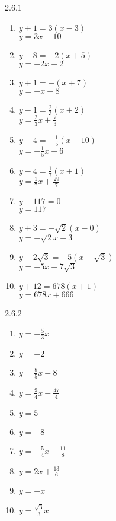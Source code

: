 \begin{Answer}{2.6.1}
	\begin{multicols}{2}
		\begin{enumerate}

			\item $y+1 = 3(x-3)$ \\ $y = 3x-10$
			\item $y-8 = -2(x+5)$ \\ $y = -2x-2$
			\item $y + 1 = -(x+7)$ \\ $y = -x-8$
			\item $y - 1 = \frac{2}{3} (x+2)$ \\ $y = \frac{2}{3} x + \frac{7}{3}$
			\item $y - 4 = -\frac{1}{5} (x-10)$ \\ $y = -\frac{1}{5} x + 6$
			\item $y - 4 = \frac{1}{7}(x + 1)$ \\ $y = \frac{1}{7}x + \frac{29}{7}$
			\item $y - 117 = 0$ \\ $y = 117$
			\item $y + 3 = -\sqrt{2}(x - 0)$ \\ $y = -\sqrt{2}x - 3$
			\item $y - 2\sqrt{3} = -5(x - \sqrt{3})$ \\ $y = -5x + 7\sqrt{3}$
			\item $y + 12 = 678(x + 1)$ \\ $y = 678x + 666$

		\end{enumerate}
	\end{multicols}
\end{Answer}
\begin{Answer}{2.6.2}
	\begin{multicols}{2}
		\begin{enumerate}

			\item $y = -\frac{5}{3}x$
			\item $y = -2$
			\item $y = \frac{8}{5}x - 8$
			\item $y = \frac{9}{4}x - \frac{47}{4}$
			\item $y = 5$
			\item $y = -8$
			\item $y = -\frac{5}{4} x + \frac{11}{8}$
			\item $y = 2x + \frac{13}{6}$
			\item $y = -x$
			\item $y = \frac{\sqrt{3}}{3} x$

		\end{enumerate}
	\end{multicols}

\end{Answer}
